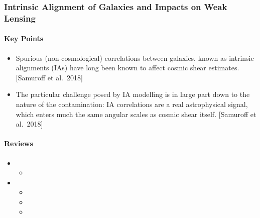 \documentclass[letterpaper,10pt,english]{sphinxmanual}
\begin{document}
\subsubsection{Intrinsic Alignment of Galaxies and Impacts on Weak Lensing}
\label{\detokenize{resource/astro/reference/wl_intrinsic_alignment:intrinsic-alignment-of-galaxies-and-impacts-on-weak-lensing}}\label{\detokenize{resource/astro/reference/wl_intrinsic_alignment::doc}}

\paragraph{Key Points}
\label{\detokenize{resource/astro/reference/wl_intrinsic_alignment:key-points}}\begin{itemize}
\item {} 
Spurious (non-cosmological) correlations between galaxies, known as
intrinsic alignments (IAs) have long been known to affect cosmic
shear estimates. {[}Samuroff et al. 2018{]}

\item {} 
The particular challenge posed by IA modelling is in large part down
to the nature of the contamination: IA correlations are a real
astrophysical signal, which enters much the same angular scales as
cosmic shear itself. {[}Samuroff et al. 2018{]}

\end{itemize}


\paragraph{Reviews}
\label{\detokenize{resource/astro/reference/wl_intrinsic_alignment:reviews}}\begin{itemize}
\item {} 
\begin{itemize}
\item {} 

\end{itemize}

\item {} 
\begin{itemize}
\item {} 

\item {} 

\item {} 

\end{itemize}

\end{itemize}
\end{document}
